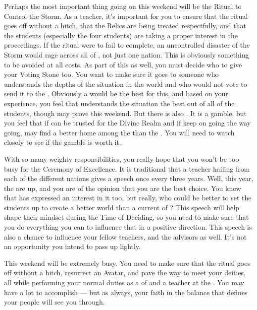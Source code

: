 \documentclass[char]{GL2020}
\begin{document}
Perhaps the most important thing going on this weekend will be the Ritual to Control the Storm. As a teacher, it's important for you to ensure that the ritual goes off without a hitch, that the Relics are being treated respectfully, and that the students (especially the four \pShip{} students) are taking a proper interest in the proceedings. If the ritual were to fail to complete, an uncontrolled disaster of the Storm would rage across all of \pEarth{}, not just one nation. This is obviously something to be avoided at all costs. As part of this as well, you must decide who to give your Voting Stone too. You want to make sure it goes to someone who understands the depths of the situation in the world and who would not vote to send it to the \pShip{}. Obviously a \pShippie{} would be the best for this, and based on your experience, you feel that \cWarlordDaughter{} understands the situation the best out of all of the students, though \cInitiate{} may prove \cInitiate{\themself} this weekend. But there is also \cAmbition{}. It is a gamble, but you feel that if \cAmbition{\they} can be trusted for the Divine Realm and if \cAmbition{\they} keep\cAmbition{\verbs} on going the way \cAmbition{\theyare} going, \cAmbition{\they} may find a better home among the \pShippies{} than the \pTech{}. You will need to watch \cAmbition{\them} closely to see if the gamble is worth it.  

With so many weighty responsibilities, you really hope that you won't be too busy for the Ceremony of Excellence. It is traditional that a teacher hailing from each of the different nations gives a speech once every three years. Well, this year, the \pShip{} are up, and you are of the opinion that you are the best choice. You know that \cPirate{} has expressed an interest in it too, but really, who could be better to set the students up to create a better world than a current \cFlowPriest{\cleric} of \cFlowFull{\full}? This speech will help shape their mindset during the Time of Deciding, so you need to make sure that you do everything you can to influence that in a positive direction. This speech is also a chance to influence your fellow teachers, and the advisors as well. It's not an opportunity you intend to pass up lightly.

This weekend will be extremely busy. You need to make sure that the ritual goes off without a hitch, resurrect an Avatar, and pave the way to meet your deities, all while performing your normal duties as a \cFlowPriest{\cleric} of \cFlow{} and a teacher at the \pSchool{}. You may have a lot to accomplish — but as always, your faith in the balance that defines your people will see you through.
\end{document}
